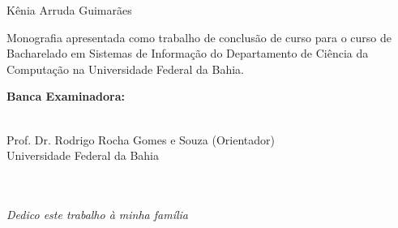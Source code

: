 \documentclass[12pt, a4paper]{report}
\begin{document}
\newpage
\begin{center}

\vspace{2.2cm}

\large{Kênia Arruda Guimarães}
\end{center}

\vspace{2.2cm}

\begin{flushright}
\begin{minipage}{8.6cm} 
Monografia apresentada como trabalho de conclusão de curso para o curso de Bacharelado em Sistemas de Informação do Departamento de Ciência da Computação na Universidade Federal da Bahia.
\end{minipage}
\end{flushright}
 
\vspace{1cm}
\begin{center}
\Large \textbf{Banca Examinadora:}
\end{center}
\vspace{1.5cm}

\begin{flushright}
\begin{minipage}[l]{12cm}
\begin{center}
\uline{\hspace{10.5cm}} \\
Prof. Dr. Rodrigo Rocha Gomes e Souza (Orientador) \\ Universidade Federal da Bahia \\
\vspace{1cm}
\uline{\hspace{10.5cm}} \\

\vspace{1cm}
\uline{\hspace{10.5cm}} \\


\end{center}
\end{minipage}
\end{flushright}

\newpage
\vspace*{21cm}
\begin{flushright}
\textit{Dedico este trabalho à minha família}
\end{flushright}
\end{document}
